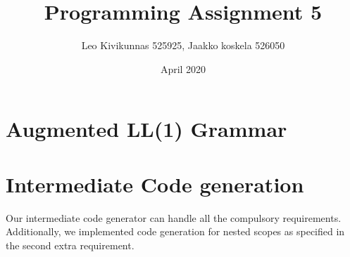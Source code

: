 \documentclass{article}
\title{Programming Assignment 5}
\author{Leo Kivikunnas 525925, Jaakko koskela 526050}
\date{April 2020}
\begin{document}
\maketitle

\section{Augmented LL(1) Grammar}



\clearpage

\section{Intermediate Code generation}

Our intermediate code generator can handle all the compulsory
requirements. Additionally, we implemented code generation for
nested scopes as specified in the second extra requirement.
\end{document}
